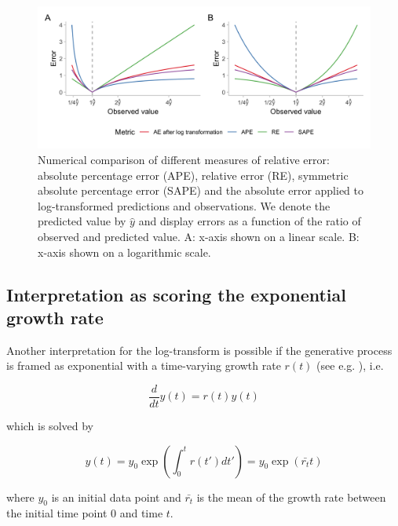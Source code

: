 \documentclass[10pt,letterpaper]{article}
\begin{document}
\begin{figure}[h!]
\centering
\includegraphics[width = 1\textwidth]{../output/figures/different-relative-errors.png}
\caption{Numerical comparison of different measures of relative error: absolute percentage error (APE), relative error (RE), symmetric absolute percentage error (SAPE) and the absolute error applied to log-transformed predictions and observations. We denote the predicted value by $\hat{y}$ and display errors as a function of the ratio of observed and predicted value. A: x-axis shown on a linear scale. B: x-axis shown on a logarithmic scale.}
\label{fig:SAPE}
\end{figure}

\subsection*{Interpretation as scoring the exponential growth rate}
\label{sec:methods:growthrate}

Another interpretation for the log-transform is possible if the generative process is framed as exponential with a time-varying growth rate $r(t)$ (see e.g. \cite{wallingaHowGenerationIntervals2007}), i.e.
\begin{linenomath*}
\begin{equation}
\frac{d}{dt}y(t) = r(t)y(t)
\end{equation}
\end{linenomath*}
%
which is solved by
%
\begin{linenomath*}
\begin{equation}
y(t) = y_0 \exp \left( \int_0^t r(t') dt' \right) = y_0 \exp (\bar{r_t}t)
\end{equation}
\end{linenomath*}
where $y_0$ is an initial data point and $\bar{r_t}$ is the mean of the growth rate between the initial time point $0$ and time $t$.
\end{document}

